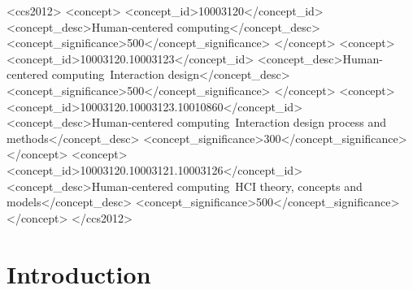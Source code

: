 \documentclass [sigconf, review, anonymous] {acmart}
\begin{document}
\begin{CCSXML}
<ccs2012>
   <concept>
       <concept_id>10003120</concept_id>
       <concept_desc>Human-centered computing</concept_desc>
       <concept_significance>500</concept_significance>
       </concept>
   <concept>
       <concept_id>10003120.10003123</concept_id>
       <concept_desc>Human-centered computing~Interaction design</concept_desc>
       <concept_significance>500</concept_significance>
       </concept>
   <concept>
       <concept_id>10003120.10003123.10010860</concept_id>
       <concept_desc>Human-centered computing~Interaction design process and methods</concept_desc>
       <concept_significance>300</concept_significance>
       </concept>
   <concept>
       <concept_id>10003120.10003121.10003126</concept_id>
       <concept_desc>Human-centered computing~HCI theory, concepts and models</concept_desc>
       <concept_significance>500</concept_significance>
       </concept>
 </ccs2012>
\end{CCSXML}




 
\maketitle

\section{Introduction}
\end{document}
